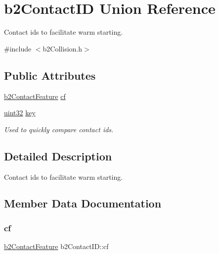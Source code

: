 \hypertarget{unionb2_contact_i_d}{}\section{b2\+Contact\+ID Union Reference}
\label{unionb2_contact_i_d}


Contact ids to facilitate warm starting.  




{\ttfamily \#include $<$b2\+Collision.\+h$>$}

\subsection*{Public Attributes}
\begin{DoxyCompactItemize}
\item 
\mbox{\hyperlink{structb2_contact_feature}{b2\+Contact\+Feature}} \mbox{\hyperlink{unionb2_contact_i_d_a58b6732f909bc760f75e7aff3cd4be08}{cf}}
\item 
\mbox{\hyperlink{b2_settings_8h_a1134b580f8da4de94ca6b1de4d37975e}{uint32}} \mbox{\hyperlink{unionb2_contact_i_d_a04c04f8fdcb799b33552d01b3aa3f245}{key}}
\begin{DoxyCompactList}\small\item\em Used to quickly compare contact ids. \end{DoxyCompactList}\end{DoxyCompactItemize}


\subsection{Detailed Description}
Contact ids to facilitate warm starting. 

\subsection{Member Data Documentation}
\mbox{\label{unionb2_contact_i_d_a58b6732f909bc760f75e7aff3cd4be08}} 
\subsubsection{\texorpdfstring{cf}{cf}}
{\footnotesize\ttfamily \mbox{\hyperlink{structb2_contact_feature}{b2\+Contact\+Feature}} b2\+Contact\+I\+D\+::cf}

\mbox{\label{unionb2_contact_i_d_a04c04f8fdcb799b33552d01b3aa3f245}} 
